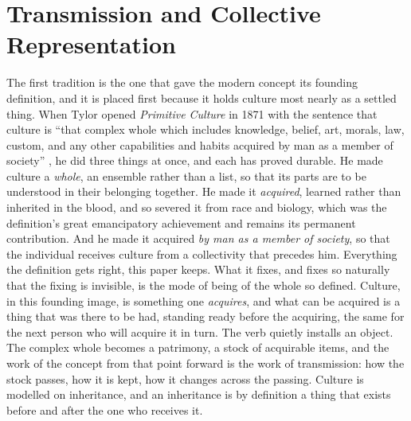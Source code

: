 \section{Transmission and Collective Representation}
\label{p24:sec:transmission}

\noindent
The first tradition is the one that gave the modern concept its founding definition, and it is placed first because it holds culture most nearly as a settled thing. When Tylor opened \emph{Primitive Culture} in 1871 with the sentence that culture is ``that complex whole which includes knowledge, belief, art, morals, law, custom, and any other capabilities and habits acquired by man as a member of society'' \parencite{tylor1871}, he did three things at once, and each has proved durable. He made culture a \emph{whole}, an ensemble rather than a list, so that its parts are to be understood in their belonging together. He made it \emph{acquired}, learned rather than inherited in the blood, and so severed it from race and biology, which was the definition's great emancipatory achievement and remains its permanent contribution. And he made it acquired \emph{by man as a member of society}, so that the individual receives culture from a collectivity that precedes him. Everything the definition gets right, this paper keeps. What it fixes, and fixes so naturally that the fixing is invisible, is the mode of being of the whole so defined. Culture, in this founding image, is something one \emph{acquires}, and what can be acquired is a thing that was there to be had, standing ready before the acquiring, the same for the next person who will acquire it in turn. The verb quietly installs an object. The complex whole becomes a patrimony, a stock of acquirable items, and the work of the concept from that point forward is the work of transmission: how the stock passes, how it is kept, how it changes across the passing. Culture is modelled on inheritance, and an inheritance is by definition a thing that exists before and after the one who receives it.

